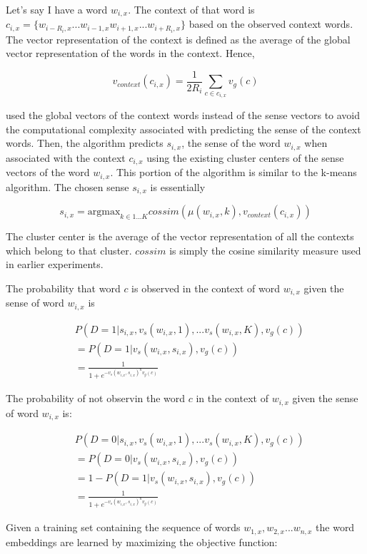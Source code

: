 Let's say I have a word $w_{i,x}$. The context of that word is $c_{i, x} = \{w_{i-R_i, x} ... w_{i-1, x} w_{i+1, x} ... w_{i+R_i,x}\}$ based on the observed context words. The vector representation of the context is defined as the average of the global vector representation of the words in the context. Hence,

\[v_{context}(c_{i,x}) = \frac{1}{2R_i}\sum_{c \in c_{i, x}} v_g(c)\]

\cite{neelakantan2015efficient} used the global vectors of the context words instead of the sense vectors to avoid the computational complexity associated with predicting the sense of the context words. Then, the algorithm predicts $s_{i, x}$, the sense of the word $w_{i,x}$ when associated with the context $c_{i, x}$ using the existing cluster centers of the sense vectors of the word $w_{i,x}$. This portion of the algorithm is similar to the k-means algorithm. The chosen sense $s_{i,x}$ is essentially

\[s_{i,x} = \mathrm{argmax}_{k \in 1 ... K} cossim(\mu(w_{i,x}, k), v_{context}(c_{i,x}))\]

The cluster center is the average of the vector representation of all the contexts which belong to that cluster. $cossim$ is simply the cosine similarity measure used in earlier experiments.

The probability that word $c$ is observed in the context of word $w_{i, x}$ given the sense of word $w_{i,x}$ is

\begin{align*}
&P(D = 1 | s_{i,x}, v_s(w_{i,x}, 1), ... v_s(w_{i,x}, K), v_g(c)) \\
&= P(D=1|v_s(w_{i,x}, s_{i,x}), v_g(c)) \\
&= \frac{1}{1 + e^{-v_s(w_{i,x}, s_{i,x})^n v_g(c)}}
\end{align*}

The probability of not observin the word $c$ in the context of $w_{i,x}$ given the sense of word $w_{i,x}$ is:

\begin{align*}
&P(D = 0 | s_{i,x}, v_s(w_{i,x}, 1), ... v_s(w_{i,x}, K), v_g(c)) \\
&= P(D=0|v_s(w_{i,x}, s_{i,x}), v_g(c)) \\
&= 1 - P(D=1|v_s(w_{i,x}, s_{i,x}), v_g(c)) \\
&= \frac{1}{1 + e^{-v_s(w_{i,x}, s_{i,x})^n v_g(c)}}
\end{align*}

Given a training set containing the sequence of words $w_{1,x}, w_{2,x} ... w_{n,x}$ the word embeddings are learned by maximizing the objective function:

